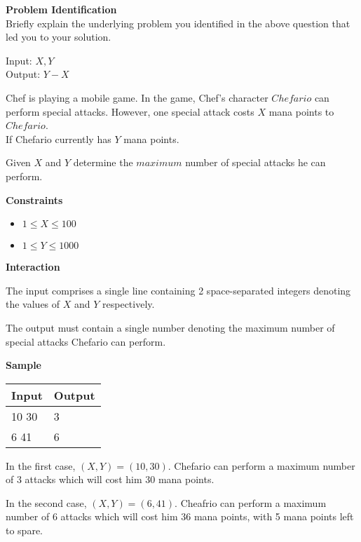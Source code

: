 \documentclass[a4paper]{exam}
\newcommand\heading[1]{\textbf{#1}}
\begin{document}
\begin{questions}
    \heading{Problem Identification}\\
    Briefly explain the underlying problem you identified in the above question that led you to your solution.

    \begin{mdframed}
      Input: $X,Y$\\
      Output: $Y-X$\\
    \end{mdframed}


    Chef is playing a mobile game. In the game, Chef's character $Chefario$ can perform special attacks.
    However, one special attack costs $X$ mana points to $Chefario$.
    \\
    If Chefario currently has $Y$ mana points.


    Given $X$ and $Y$ determine the $maximum$ number of special attacks he can perform.

    \heading{Constraints}
    \begin{itemize}
        \item $1 \le X \le 100$
        \item $1 \le Y \le 1000$
    \end{itemize}


    \heading{Interaction}

    The input comprises a single line containing 2 space-separated integers denoting the values of $X$ and $Y$ respectively.

    The output must contain a single number denoting the maximum number of special attacks Chefario can perform.

    \heading{Sample}

    \begin{tabularx}{\textwidth}{|X|X|}
        \rowcolor{gray!50}
        \hline
        Input & Output \\ \hline\hline
        10 30 & 3      \\\hline
        6 41  & 6      \\\hline
    \end{tabularx}

    In the first case, $(X,Y)=(10,30)$. Chefario can perform a maximum number of 3 attacks which will cost him 30 mana points.

    In the second case, $(X,Y)=(6,41)$. Cheafrio can perform a maximum number of 6 attacks which will cost him 36 mana points, with 5 mana points left to spare.


\end{questions}
\end{document}
